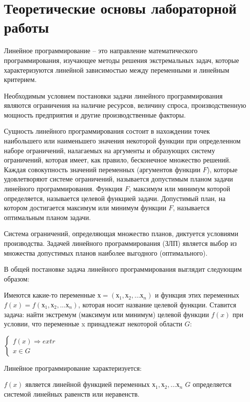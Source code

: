 \documentclass[12pt]{article}
\begin{document}
\section*{Теоретические основы лабораторной работы}

Линейное программирование – это направление математического
программирования, изучающее методы решения экстремальных задач, которые
характеризуются линейной зависимостью между переменными и линейным критерием.

Необходимым условием постановки задачи линейного программирования являются
ограничения на наличие ресурсов, величину спроса, производственную мощность
предприятия и другие производственные факторы.

Сущность линейного программирования состоит в нахождении точек наибольшего
или наименьшего значения некоторой функции при определенном наборе ограничений,
налагаемых на аргументы и образующих систему ограничений, которая имеет, как
правило, бесконечное множество решений. Каждая совокупность значений переменных
(аргументов функции $F$), которые удовлетворяют системе ограничений, называется
допустимым планом задачи линейного программирования. Функция $F$, максимум или
минимум которой определяется, называется целевой функцией задачи. Допустимый план,
на котором достигается максимум или минимум функции $F$, называется оптимальным
планом задачи.

Система ограничений, определяющая множество планов, диктуется условиями
производства. Задачей линейного программирования (ЗЛП) является выбор из множества
допустимых планов наиболее выгодного (оптимального).

В общей постановке задача линейного программирования выглядит следующим
образом:

Имеются какие-то переменные $х = (х_1,  х_2 , … х_n )$ и функция этих переменных $f(x) =
f (х_1, х_2, … х_n )$, которая носит название целевой функции. Ставится задача: найти
экстремум (максимум или минимум) целевой функции $f(x)$ при условии, что переменные x
принадлежат некоторой области $G$:

\begin{center}
$\begin{cases}
   f(x) \Rightarrow extr \\
  x \in G 
 \end{cases}$
 \end{center}
 
Линейное программирование характеризуется:
\begin{itemize}
 $f(x)$ является линейной функцией переменных $х_1 , х_2 , … х_n$
 $G$ определяется системой линейных равенств или неравенств.
\end{itemize}
\end{document}
